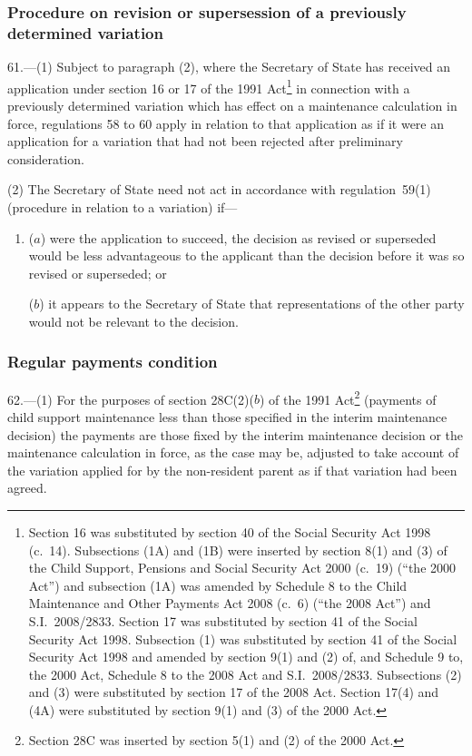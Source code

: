 \documentclass[12pt,a4paper]{article}
\begin{document}
\subsubsection[61. Procedure on revision or supersession of a previously determined variation]{Procedure on revision or supersession of a previously determined variation}

61.---(1)  Subject to paragraph (2), where the Secretary of State has received an application under section 16 or 17 of the 1991 Act\footnote{Section 16 was substituted by section 40 of the Social Security Act 1998 (c.~14). Subsections (1A) and (1B) were inserted by section 8(1) and (3) of the Child Support, Pensions and Social Security Act 2000 (c.~19) (“the 2000 Act”) and subsection (1A) was amended by Schedule 8 to the Child Maintenance and Other Payments Act 2008 (c.~6) (“the 2008 Act”) and S.I.~2008/2833. Section 17 was substituted by section 41 of the Social Security Act 1998. Subsection (1) was substituted by section 41 of the Social Security Act 1998 and amended by section 9(1) and (2) of, and Schedule 9 to, the 2000 Act, Schedule 8 to the 2008 Act and S.I.~2008/2833. Subsections (2) and (3) were substituted by section 17 of the 2008 Act. Section 17(4) and (4A) were substituted by section 9(1) and (3) of the 2000 Act.} in connection with a previously determined variation which has effect on a maintenance calculation in force, regulations 58 to 60 apply in relation to that application as if it were an application for a variation that had not been rejected after preliminary consideration.

(2) The Secretary of State need not act in accordance with regulation~59(1) (procedure in relation to a variation) if—
\begin{enumerate}\item[]
($a$) were the application to succeed, the decision as revised or superseded would be less advantageous to the applicant than the decision before it was so revised or superseded; or

($b$) it appears to the Secretary of State that representations of the other party would not be relevant to the decision.
\end{enumerate}

\subsubsection[62. Regular payments condition]{Regular payments condition}

62.---(1)  For the purposes of section 28C(2)($b$)  of the 1991 Act\footnote{Section 28C was inserted by section 5(1) and (2) of the 2000 Act.} (payments of child support maintenance less than those specified in the interim maintenance decision) the payments are those fixed by the interim maintenance decision or the maintenance calculation in force, as the case may be, adjusted to take account of the variation applied for by the non-resident parent as if that variation had been agreed.
\end{document}
